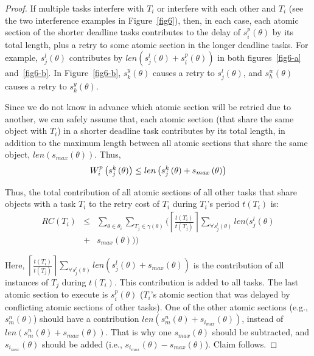 \documentclass{sig-alternate}
\begin{document}
\begin{proof}
If multiple tasks interfere with $T_{i}$ or
interfere with each other and $T_{i}$ (see the two interference examples in Figure~\ref{fig6}), then, in each case, each atomic section of the shorter deadline tasks contributes to the delay of $s_{i}^{p}(\theta)$ by its total length, plus a retry to some atomic section in the longer deadline tasks. For example,
$s_{j}^{l}(\theta)$ contributes by $len(s_{j}^{l}(\theta)+s_{i}^{p}(\theta))$
in both figures~\ref{fig6-a} and~\ref{fig6-b}. 
In Figure~\ref{fig6-b}, $s_{k}^{y}(\theta)$ causes a retry 
to $s_{j}^{l}(\theta)$, and $s_{h}^{w}(\theta)$ causes a retry to $s_{k}^{y}(\theta)$.


Since we do not know in advance which atomic section will be retried
due to another, we can safely assume that, each atomic section (that share the same object with  $T_i$) in a shorter deadline task contributes by its total length, in addition to the maximum length between all atomic sections that share the same object, $len(s_{max}(\theta))$. Thus, 
\begin{equation}
\mbox{\ensuremath{W_{i}^{p}\left(s_{j}^{k}\left(\theta\right)\right)\le len\left(s_{j}^{k}\left(\theta\right)+s_{max}\left(\theta\right)\right)}}\label{eq2}\end{equation}


Thus, the total contribution of all atomic sections of all other tasks
that share objects with a task $T_i$ 
to the retry cost of $T_i$ during $T_i$'s period $t(T_{i})$ is:
\begin{eqnarray}
RC\left(T_{i}\right) & \le & \sum_{\theta\in\theta_{i}}\sum_{T_{j}\in\gamma(\theta)}\Big(\left\lceil\frac{t\left(T_{i}\right)}{t\left(T_{j}\right)}\right\rceil\sum_{\forall s_{j}^{l}(\theta)}len\big(s_{j}^{l}(\theta)\nonumber \\
 & + & s_{max}(\theta)\big)\Big)\label{eq3-1}\end{eqnarray}



Here, $\left\lceil\frac{t\left(T_{i}\right)}{t\left(T_{j}\right)}\right\rceil\sum_{\forall s_{j}^{l}\left(\theta\right)}len\left(s_{j}^{l}\left(\theta\right)+s_{max}\left(\theta\right)\right)$ is  the contribution of all instances of $T_{j}$ during $t(T_{i})$. This contribution is added to all tasks. The last atomic section to execute is $s_{i}^{p}(\theta)$ ($T_i$'s atomic section that was delayed by conflicting atomic sections of other tasks). One of the other atomic sections (e.g., $s_{m}^{n}(\theta)$) should have a contribution $len(s_{m}^{n}(\theta)+s_{i_{max}}(\theta))$, instead of $len(s_{m}^{n}(\theta)+s_{max}(\theta))$. That is why one $s_{max}(\theta)$ should be subtracted, and $s_{i_{max}}(\theta)$ should be added (i.e., $s_{i_{max}}(\theta)-s_{max}(\theta)$). Claim follows.
\end{proof}
\end{document}
